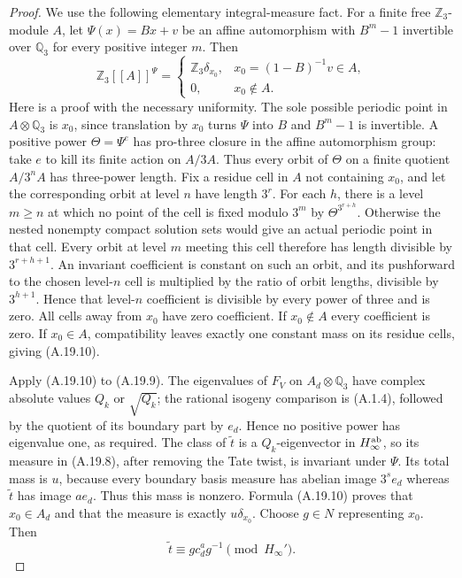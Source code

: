 \begin{proof}
We use the following elementary integral-measure fact.
For a finite free $\mathbb Z_3$-module $A$, let
$\Psi(x)=Bx+v$ be an affine automorphism with
$B^m-1$ invertible over $\mathbb Q_3$ for every positive
integer $m$. Then
\[
 \mathbb Z_3[[A]]^{\Psi}=
 \begin{cases}
 \mathbb Z_3\delta_{x_0},&x_0=(1-B)^{-1}v\in A,\\
 0,&x_0\notin A.
 \end{cases}
 \tag{A.19.10}
\]
Here is a proof with the necessary uniformity. The sole
possible periodic point in $A\otimes\mathbb Q_3$ is
$x_0$, since translation by $x_0$ turns $\Psi$ into
$B$ and $B^m-1$ is invertible. A positive power
$\Theta=\Psi^e$ has pro-three closure in the affine
automorphism group: take $e$ to kill its finite action
on $A/3A$. Thus every orbit of $\Theta$ on a finite
quotient $A/3^nA$ has three-power length.
Fix a residue cell in $A$ not containing $x_0$, and
let the corresponding orbit at level $n$ have length
$3^r$. For each $h$, there is a level $m\ge n$ at
which no point of the cell is fixed modulo $3^m$ by
$\Theta^{3^{r+h}}$. Otherwise the nested nonempty
compact solution sets would give an actual periodic
point in that cell. Every orbit at level $m$ meeting
this cell therefore has length divisible by
$3^{r+h+1}$. An invariant coefficient is constant on
such an orbit, and its pushforward to the chosen
level-$n$ cell is multiplied by the ratio of orbit
lengths, divisible by $3^{h+1}$. Hence that level-$n$
coefficient is divisible by every power of three and
is zero. All cells away from $x_0$ have zero coefficient.
If $x_0\notin A$ every coefficient is zero. If
$x_0\in A$, compatibility leaves exactly one constant
mass on its residue cells, giving (A.19.10).

Apply (A.19.10) to (A.19.9). The eigenvalues of $F_V$
on $A_d\otimes\mathbb Q_3$ have complex absolute
values $Q_k$ or $\sqrt{Q_k}$; the rational isogeny
comparison is (A.1.4), followed by the quotient of its
boundary part by $e_d$. Hence no positive power has
eigenvalue one, as required. The class of
$\widetilde t$ is a $Q_k$-eigenvector in
$H_\infty^{\rm ab}$, so its measure in (A.19.8),
after removing the Tate twist, is invariant under
$\Psi$. Its total mass is $u$, because every boundary
basis measure has abelian image $3^s e_d$ whereas
$\widetilde t$ has image $a e_d$. Thus this mass is
nonzero. Formula (A.19.10) proves that $x_0\in A_d$
and that the measure is exactly $u\delta_{x_0}$.
Choose $g\in N$ representing $x_0$. Then
\[
 \widetilde t\equiv g c_d^a g^{-1}\pmod {H_\infty'}.
 \tag{A.19.11}
\]


\end{proof}
